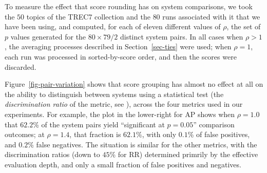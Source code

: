 To measure the effect that score rounding has on system comparisons,
we took the $50$ topics of the TREC7 collection and the $80$ runs
associated with it that we have been using, and computed, for each of
eleven different values of $\rho$, the set of $p$ values generated
for the $80\times79/2$ distinct system pairs.
In all cases when $\rho>1$, the averaging processes described in
Section~\ref{sec-ties} were used; when $\rho=1$, each run was
processed in sorted-by-score order, and then the scores were
discarded.

Figure~\ref{fig-pair-variation} shows that score grouping has almost
no effect at all on the ability to distinguish between systems using
a statistical test (the {\emph{discrimination ratio}} of the metric,
see {\citet{sakai07sigir}}), across the four metrics used in our
experiments.
For example, the plot in the lower-right for AP shows when $\rho=1.0$
that $62.2$\% of the system pairs yield ``significant at $p=0.05$''
comparison outcomes; at $\rho=1.4$, that fraction is $62.1\%$, with
only $0.1$\% of false positives, and $0.2$\% false negatives.
The situation is similar for the other metrics, with the
discrimination ratios (down to $45$\% for RR) determined primrily by
the effective evaluation depth, and only a small fraction of false
positives and negatives.
